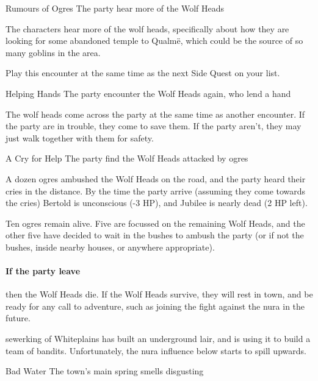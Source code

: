 \begin{multicols}{2}
{\N Rumours of Ogres}%
{The party hear more of the Wolf Heads}%

The characters hear more of the wolf heads, specifically about how they are looking for some abandoned temple to Qualm\"e, which could be the source of so many goblins in the area.

Play this encounter at the same time as the next Side Quest on your list.

{Helping Hands}%
{The party encounter the Wolf Heads again, who lend a hand}%

The wolf heads come across the party at the same time as another encounter.
If the party are in trouble, they come to save them.
If the party aren't, they may just walk together with them for safety.

{\N A Cry for Help}%
{The party find the Wolf Heads attacked by ogres}%

A dozen ogres ambushed the Wolf Heads on the road, and the party heard their cries in the distance.
By the time the party arrive (assuming they come towards the cries) Bertold is unconscious (-3 HP), and Jubilee is nearly dead (2 HP left).

Ten ogres remain alive.
Five are focussed on the remaining Wolf Heads, and the other five have decided to wait in the bushes to ambush the party (or if not the bushes, inside nearby houses, or anywhere appropriate).

\paragraph{If the party leave}
then the Wolf Heads die.
If the Wolf Heads survive, they will rest in \gls{town}, and be ready for any call to adventure, such as joining the fight against the nura in the future.



\stopcontents[sq]

\label{sewerking}

\startcontents[sq]

\sqminitoc

\noindent
\Gls{sewerking} of Whiteplains has built an underground lair, and is using it to build a team of bandits.
Unfortunately, the nura influence below starts to spill upwards.

{\N Bad Water}%
{The town's main spring smells disgusting}%


\end{multicols}
